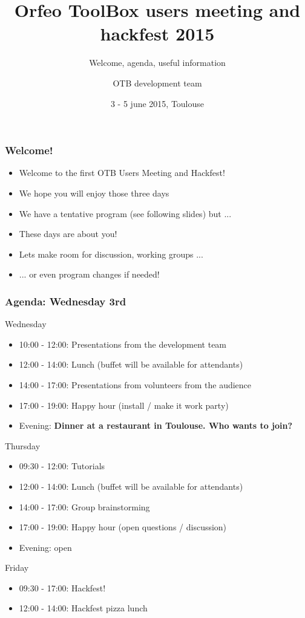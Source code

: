 \documentclass[8pt]{beamer}
\title{Orfeo ToolBox users meeting and hackfest 2015}
\subtitle{Welcome, agenda, useful information}
\author{OTB development team}%
\date{3 - 5 june 2015, Toulouse}
\begin{document}
\begin{frame}
\titlepage
\end{frame}

\begin{frame}
\frametitle{Welcome!}
\begin{itemize}
\item Welcome to the first OTB Users Meeting and Hackfest!
\item We hope you will enjoy those three days
\item We have a tentative program (see following slides) but ...
\item These days are about you!
\item Lets make room for discussion, working groups ...
\item ... or even program changes if needed!
\end{itemize}
\end{frame}

\begin{frame}
\frametitle{Agenda: Wednesday 3rd}

\begin{block}{Wednesday}
\begin{itemize}
\item 10:00 - 12:00: Presentations from the development team
\item 12:00 - 14:00: Lunch (buffet will be available for attendants)
\item 14:00 - 17:00: Presentations from volunteers from the audience 
\item 17:00 - 19:00: Happy hour (install / make it work party)
\item Evening: \textbf{Dinner at a restaurant in Toulouse. Who wants to join?}
\end{itemize}
\end{block}

\begin{block}{Thursday}
\begin{itemize}
\item 09:30 - 12:00: Tutorials
\item 12:00 - 14:00: Lunch (buffet will be available for attendants)
\item 14:00 - 17:00: Group brainstorming 
\item 17:00 - 19:00: Happy hour (open questions / discussion)
\item Evening: open
\end{itemize}
\end{block}

\begin{block}{Friday}
\begin{itemize}
\item 09:30 - 17:00: Hackfest!
\item 12:00 - 14:00: Hackfest pizza lunch
\end{itemize}
\end{block}
\end{frame}
\end{document}

